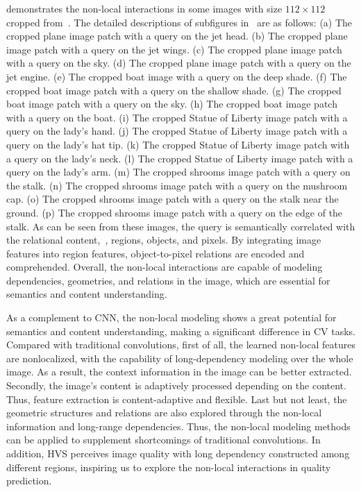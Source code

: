 	 demonstrates the non-local interactions in some images with size $112 \times 112$ cropped from~. The detailed descriptions of subfigures in~ are as follows: (a) The cropped plane image patch with a query on the jet head. (b) The cropped plane image patch with a query on the jet wings. (c) The cropped plane image patch with a query on the sky. (d) The cropped plane image patch with a query on the jet engine. (e) The cropped boat image with a query on the deep shade. (f) The cropped boat image patch with a query on the shallow shade. (g) The cropped boat image patch with a query on the sky. (h) The cropped boat image patch with a query on the boat. (i) The cropped Statue of Liberty image patch with a query on the lady's hand. (j) The cropped Statue of Liberty image patch with a query on the lady's hat tip. (k) The cropped Statue of Liberty image patch with a query on the lady's neck. (l) The cropped Statue of Liberty image patch with a query on the lady's arm. (m) The cropped shrooms image patch with a query on the stalk. (n) The cropped shrooms image patch with a query on the mushroom cap. (o) The cropped shrooms image patch with a query on the stalk near the ground. (p) The cropped shrooms image patch with a query on the edge of the stalk. As can be seen from these images, the query is semantically correlated with the relational content,~\eg, regions, objects, and pixels. By integrating image features into region features, object-to-pixel relations are encoded and comprehended. Overall, the non-local interactions are capable of modeling dependencies, geometries, and relations in the image, which are essential for semantics and content understanding.
	
	As a complement to CNN, the non-local modeling shows a great potential for semantics and content understanding, making a significant difference in CV tasks. Compared with traditional convolutions, first of all, the learned non-local features are nonlocalized, with the capability of long-dependency modeling over the whole image. As a result, the context information in the image can be better extracted. Secondly, the image's content is adaptively processed depending on the content. Thus, feature extraction is content-adaptive and flexible. Last but not least, the geometric structures and relations are also explored through the non-local information and long-range dependencies. Thus, the non-local modeling methods can be applied to supplement shortcomings of traditional convolutions. In addition, HVS perceives image quality with long dependency constructed among different regions, inspiring us to explore the non-local interactions in quality prediction.	
	
